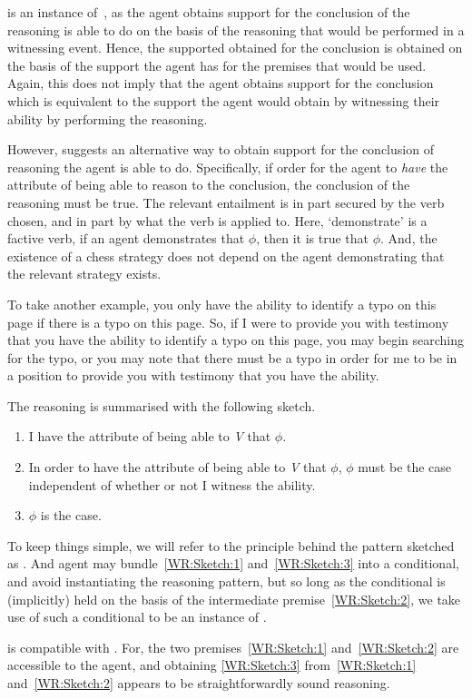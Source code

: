 \begin{note}[Attribute]

  \WR{} is an instance of~\rC{}, as the agent obtains support for the conclusion of the reasoning is able to do on the basis of the reasoning that would be performed in a witnessing event.
  Hence, the supported obtained for the conclusion is obtained on the basis of the support the agent has for the premises that would be used.
  Again, this does not imply that the agent obtains support for the conclusion which is equivalent to the support the agent would obtain by witnessing their ability by performing the reasoning.

  However, \AR{} suggests an alternative way to obtain support for the conclusion of reasoning the agent is able to do.
  Specifically, if order for the agent to \emph{have} the attribute of being able to reason to the conclusion, the conclusion of the reasoning must be true.
  The relevant entailment is in part secured by the verb chosen, and in part by what the verb is applied to.
  Here, `demonstrate' is a factive verb, if an agent demonstrates that \(\phi\), then it is true that \(\phi\).
  And, the existence of a chess strategy does not depend on the agent demonstrating that the relevant strategy exists.

  To take another example, you only have the ability to identify a typo on this page if there is a typo on this page.
  So, if I were to provide you with testimony that you have the ability to identify a typo on this page, you may begin searching for the typo, or you may note that there must be a typo in order for me to be in a position to provide you with testimony that you have the ability.

  The reasoning is summarised with the following sketch.

  \begin{enumerate}[label=(\textsf{A}\arabic*), ref=(\textsf{A}\arabic*)]
  \item\label{WR:Sketch:1} I have the attribute of being able to \emph{V} that \(\phi\).
  \item\label{WR:Sketch:2} In order to have the attribute of being able to \emph{V} that \(\phi\), \(\phi\) must be the case independent of whether or not I witness the ability.
  \item\label{WR:Sketch:3} \(\phi\) is the case.
  \end{enumerate}

  To keep things simple, we will refer to the principle behind the pattern sketched as \AR{}.
  And agent may bundle~\ref{WR:Sketch:1} and~\ref{WR:Sketch:3} into a conditional, and avoid instantiating the reasoning pattern, but so long as the conditional is (implicitly) held on the basis of the intermediate premise~\ref{WR:Sketch:2}, we take use of such a conditional to be an instance of \AR{}.

  \AR{} is compatible with \uRa{}.
  For, the two premises~\ref{WR:Sketch:1} and~\ref{WR:Sketch:2} are accessible to the agent, and obtaining \ref{WR:Sketch:3} from~\ref{WR:Sketch:1} and~\ref{WR:Sketch:2} appears to be straightforwardly sound reasoning.
\end{note}

